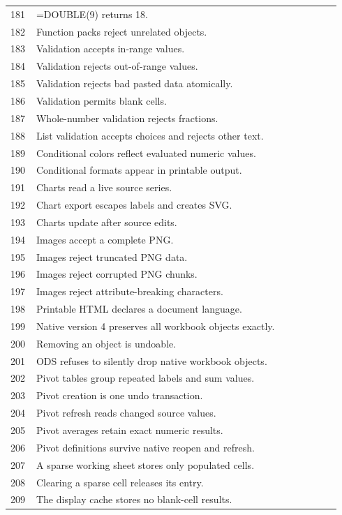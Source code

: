 \documentclass[11pt,letterpaper]{article}
\begin{document}
\begin{longtable}{@{}P{0.07\linewidth}P{0.87\linewidth}@{}}
181 & =DOUBLE(9) returns 18.\\
182 & Function packs reject unrelated objects.\\
183 & Validation accepts in-range values.\\
184 & Validation rejects out-of-range values.\\
185 & Validation rejects bad pasted data atomically.\\
186 & Validation permits blank cells.\\
187 & Whole-number validation rejects fractions.\\
188 & List validation accepts choices and rejects other text.\\
189 & Conditional colors reflect evaluated numeric values.\\
190 & Conditional formats appear in printable output.\\
191 & Charts read a live source series.\\
192 & Chart export escapes labels and creates SVG.\\
193 & Charts update after source edits.\\
194 & Images accept a complete PNG.\\
195 & Images reject truncated PNG data.\\
196 & Images reject corrupted PNG chunks.\\
197 & Images reject attribute-breaking characters.\\
198 & Printable HTML declares a document language.\\
199 & Native version 4 preserves all workbook objects exactly.\\
200 & Removing an object is undoable.\\
201 & ODS refuses to silently drop native workbook objects.\\
202 & Pivot tables group repeated labels and sum values.\\
203 & Pivot creation is one undo transaction.\\
204 & Pivot refresh reads changed source values.\\
205 & Pivot averages retain exact numeric results.\\
206 & Pivot definitions survive native reopen and refresh.\\
207 & A sparse working sheet stores only populated cells.\\
208 & Clearing a sparse cell releases its entry.\\
209 & The display cache stores no blank-cell results.\\

\end{longtable}
\end{document}
